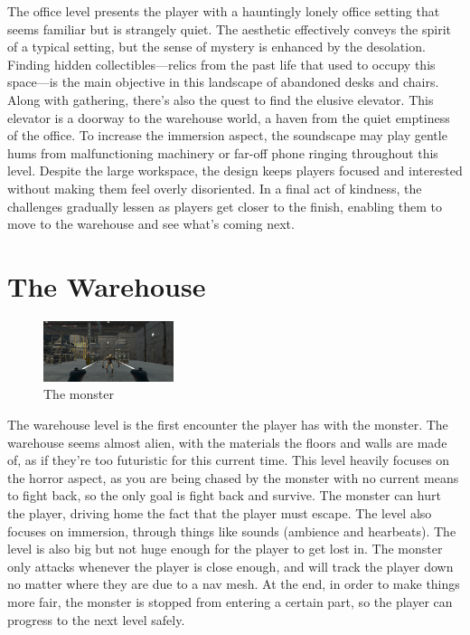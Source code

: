 \documentclass{vgtc}                          %
\begin{document}
The office level presents the player with a hauntingly lonely office setting that seems familiar but is strangely quiet. The aesthetic effectively conveys the spirit of a typical setting, but the sense of mystery is enhanced by the desolation. Finding hidden collectibles—relics from the past life that used to occupy this space—is the main objective in this landscape of abandoned desks and chairs. Along with gathering, there's also the quest to find the elusive elevator. This elevator is a doorway to the warehouse world, a haven from the quiet emptiness of the office. To increase the immersion aspect, the soundscape may play gentle hums from malfunctioning machinery or far-off phone ringing throughout this level. Despite the large workspace, the design keeps players focused and interested without making them feel overly disoriented. In a final act of kindness, the challenges gradually lessen as players get closer to the finish, enabling them to move to the warehouse and see what's coming next.

\section{The Warehouse}

\begin{figure}[htb]
  \centering
  \includegraphics[width=1.5in]{monster.png}
  \caption{The monster}
\end{figure}

The warehouse level is the first encounter the player has with the monster. The warehouse seems almost alien, with the materials the floors and walls are made of, as if they're too futuristic for this current time. This level heavily focuses on the horror aspect, as you are being chased by the monster with no current means to fight back, so the only goal is fight back and survive. The monster can hurt the player, driving home the fact that the player must escape. The level also focuses on immersion, through things like sounds (ambience and hearbeats). The level is also big but not huge enough for the player to get lost in. The monster only attacks whenever the player is close enough, and will track the player down no matter where they are due to a nav mesh. At the end, in order to make things more fair, the monster is stopped from entering a certain part, so the player can progress to the next level safely.
\end{document}
